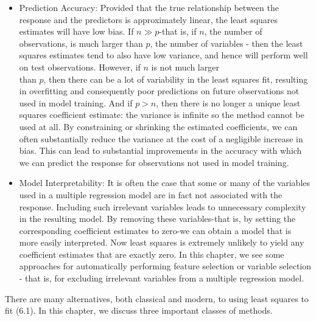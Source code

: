 \documentclass[10pt]{article}
\begin{document}
\begin{itemize}
  \item Prediction Accuracy: Provided that the true relationship between the response and the predictors is approximately linear, the least squares estimates will have low bias. If $n \gg p$-that is, if $n$, the number of observations, is much larger than $p$, the number of variables - then the least squares estimates tend to also have low variance, and hence will perform well on test observations. However, if $n$ is not much larger\\
than $p$, then there can be a lot of variability in the least squares fit, resulting in overfitting and consequently poor predictions on future observations not used in model training. And if $p>n$, then there is no longer a unique least squares coefficient estimate: the variance is infinite so the method cannot be used at all. By constraining or shrinking the estimated coefficients, we can often substantially reduce the variance at the cost of a negligible increase in bias. This can lead to substantial improvements in the accuracy with which we can predict the response for observations not used in model training.
  \item Model Interpretability: It is often the case that some or many of the variables used in a multiple regression model are in fact not associated with the response. Including such irrelevant variables leads to unnecessary complexity in the resulting model. By removing these variables-that is, by setting the corresponding coefficient estimates to zero-we can obtain a model that is more easily interpreted. Now least squares is extremely unlikely to yield any coefficient estimates that are exactly zero. In this chapter, we see some approaches for automatically performing feature selection or variable selection - that is, for excluding irrelevant variables from a multiple regression model.
\end{itemize}

There are many alternatives, both classical and modern, to using least squares to fit (6.1). In this chapter, we discuss three important classes of methods.
\end{document}
